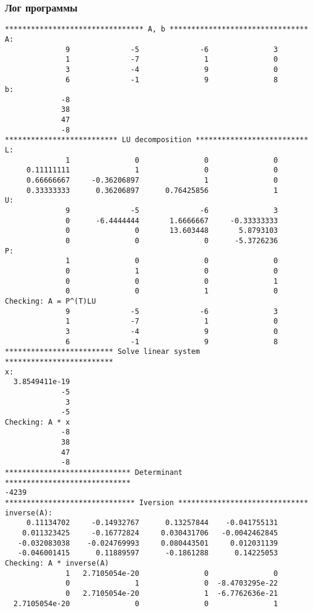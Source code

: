 \documentclass[a4paper,12pt]{article}
\begin{document}
\subsubsection{Лог программы}
\begin{verbatim}
******************************** A, b ********************************
A:
              9              -5              -6               3
              1              -7               1               0
              3              -4               9               0
              6              -1               9               8
b:
             -8
             38
             47
             -8
************************** LU decomposition **************************
L:
              1               0               0               0
     0.11111111               1               0               0
     0.66666667     -0.36206897               1               0
     0.33333333      0.36206897      0.76425856               1
U:
              9              -5              -6               3
              0      -6.4444444       1.6666667     -0.33333333
              0               0       13.603448       5.8793103
              0               0               0      -5.3726236
P:
              1               0               0               0
              0               1               0               0
              0               0               0               1
              0               0               1               0
Checking: A = P^(T)LU
              9              -5              -6               3
              1              -7               1               0
              3              -4               9               0
              6              -1               9               8
************************* Solve linear system *************************
x:
  3.8549411e-19
             -5
              3
             -5
Checking: A * x
             -8
             38
             47
             -8
***************************** Determinant *****************************
-4239
****************************** Iversion ******************************
inverse(A):
     0.11134702     -0.14932767      0.13257844    -0.041755131
    0.011323425     -0.16772824     0.030431706   -0.0042462845
   -0.032083038    -0.024769993     0.080443501     0.012031139
   -0.046001415      0.11889597      -0.1861288      0.14225053
Checking: A * inverse(A)
              1   2.7105054e-20               0               0
              0               1               0  -8.4703295e-22
              0   2.7105054e-20               1  -6.7762636e-21
  2.7105054e-20               0               0               1
\end{verbatim}
\end{document}

